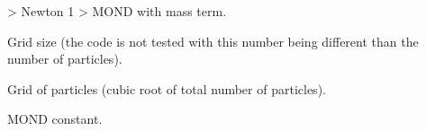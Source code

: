 \documentclass[letterpaper,10pt,english]{sphinxmanual}
\begin{document}
\begin{fulllineitems}

\begin{fulllineitems}
\label{\detokenize{data_structure:c.params.gravity}}%
\pysigstartmultiline
{}%
 \sphinxhyphen{}\textgreater{} Newton                   1 \sphinxhyphen{}\textgreater{} MOND with mass term.

\end{fulllineitems}


\begin{fulllineitems}
\label{\detokenize{data_structure:c.params.grid}}%
\pysigstartmultiline
{}%
\pysigstopmultiline
Grid size (the code is not tested with this number being different than the number of particles).

\end{fulllineitems}


\begin{fulllineitems}
\label{\detokenize{data_structure:c.params.grid_p}}%
\pysigstartmultiline
{}%
\pysigstopmultiline
Grid of particles (cubic root of total number of particles).

\end{fulllineitems}


\begin{fulllineitems}
\label{\detokenize{data_structure:c.params.hsmall}}%
\pysigstartmultiline
{}%
\pysigstopmultiline
\end{fulllineitems}


\begin{fulllineitems}
\label{\detokenize{data_structure:c.params.mm_KB}}%
\pysigstartmultiline
{}%
\pysigstopmultiline
MOND constant.

\end{fulllineitems}


\end{fulllineitems}
\end{document}
